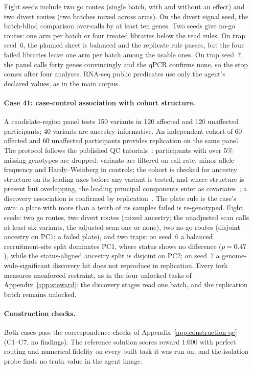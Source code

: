 Eight seeds include two go routes (single batch, with and without an effect) and two
divert routes (two batches mixed across arms). On the divert signal seed, the batch-blind
comparison over-calls by at least ten genes. Two seeds give no-go routes: one arm per batch
or four treated libraries below the read rules. On trap seed~6, the planned sheet is balanced
and the replicate rule passes, but the four failed libraries leave one arm per batch among
the usable ones. On trap seed~7, the panel calls
forty genes convincingly and the qPCR confirms none, so the stop comes after four analyses.
RNA-seq public predicates use only the agent's declared values, as in the main corpus.

\paragraph{Case 41: case-control association with cohort structure.}
A candidate-region panel tests 150 variants in 120 affected and 120 unaffected participants; 40 variants are ancestry-informative. An independent cohort of 60 affected and 60 unaffected participants provides replication on the same panel. The protocol follows the published QC tutorials~\citep{anderson2010data,marees2018tutorial}:
participants with over 5\% missing genotypes are dropped; variants are filtered on call rate, minor-allele frequency and Hardy--Weinberg in
controls; the cohort is checked for ancestry structure on its leading axes before any variant
is tested, and where structure is present but overlapping, the leading principal components
enter as covariates~\citep{price2006principal}; a discovery association is confirmed by
replication~\citep{chanock2007replicating}. The plate rule is the case's own: a plate with more than a tenth of its samples failed is re-genotyped. Eight seeds: two go routes, two divert
routes (mixed ancestry; the unadjusted scan calls at least six variants, the adjusted
scan one or none), two no-go routes (disjoint ancestry on PC1; a failed plate), and two
traps: on seed~6 a balanced recruitment-site split dominates PC1, where status shows no
difference ($p=0.47$), while the status-aligned ancestry split is disjoint on PC2; on seed~7 a
genome-wide-significant discovery hit does not reproduce in replication. Every
fork measures unenforced restraint, as in the four unlocked tasks of
Appendix~\ref{app:steward}: the discovery stages read one batch, and the replication batch remains unlocked.

\paragraph{Construction checks.}
Both cases pass the correspondence checks of Appendix~\ref{app:construction-qc} (C1--C7, no
findings). The reference solution scores reward $1.000$ with perfect routing and numerical
fidelity on every built task it was run on, and the isolation probe finds no truth value in the
agent image.

